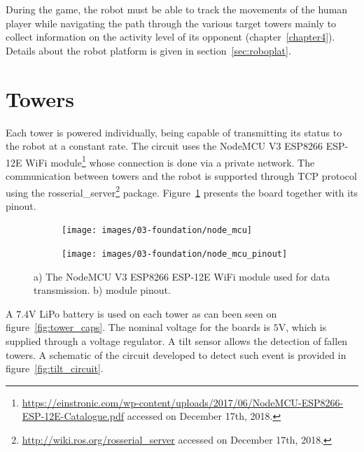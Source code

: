 During the game, the robot must be able to track the movements of the human player while navigating the path through the various target towers mainly to collect information on the activity level of its opponent (chapter~\ref{chapter4}). Details about the robot platform is given in section~\ref{sec:roboplat}.



\section{Towers}\label{sec:towers}
Each tower is powered individually, being capable of transmitting its status to the robot at a constant rate. The circuit uses the NodeMCU V3 ESP8266 ESP-12E WiFi module\footnote{\url{https://einstronic.com/wp-content/uploads/2017/06/NodeMCU-ESP8266-ESP-12E-Catalogue.pdf} accessed on December 17th, 2018.} whose connection is done via a private network. The communication between towers and the robot is supported through TCP protocol using the rosserial\_server\footnote{\url{http://wiki.ros.org/rosserial_server} accessed on December 17th, 2018.} package. Figure~\ref{fig:tower_board} presents the board together with its pinout. 

\begin{figure}[thpb]
  \centering
  \begin{subfigure}[b]{\textwidth}
  	\centering
      \texttt{[image: images/03-foundation/node\_mcu]}
	\caption{}
  \end{subfigure}
   \qquad 
  \begin{subfigure}[b]{\textwidth}
  \centering
      \texttt{[image: images/03-foundation/node\_mcu\_pinout]}
	\caption{}
  \end{subfigure}
  \caption{a) The NodeMCU V3 ESP8266 ESP-12E WiFi module used for data transmission. b) module pinout.}
  \label{fig:tower_board}
\end{figure}

A $7.4$V LiPo battery is used on each tower as can been seen on figure~\ref{fig:tower_caps}. The nominal voltage for the boards is $5$V, which is supplied through a voltage regulator. %
A tilt sensor allows the detection of fallen towers. A schematic of the circuit developed to detect such event is provided in figure~\ref{fig:tilt_circuit}.

